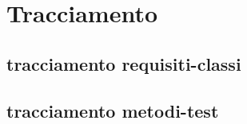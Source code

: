 \section{Tracciamento}
\subsection{tracciamento requisiti-classi}
\subsection{tracciamento metodi-test}